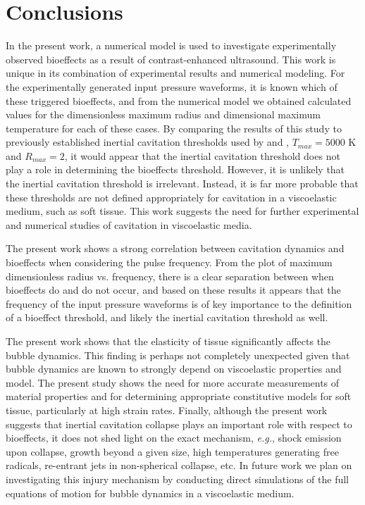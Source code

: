 \section{Conclusions}
\label{sec:conclusions}

In the present work, a numerical model is used
to investigate experimentally observed bioeffects as a result of
contrast-enhanced ultrasound. This work is unique in its 
combination of experimental results and numerical modeling.
For the experimentally generated input
pressure waveforms, it is known which of these triggered bioeffects,
and from the numerical model we obtained calculated values for
the dimensionless maximum radius and dimensional maximum temperature for each of these cases.  By comparing the
results of this study to previously established inertial cavitation
thresholds used by \cite{Apfel1991} and \cite{Yang2005},
$T_{max}=5000$ K and $R_{max}=2$, it would appear that the inertial
cavitation threshold does not play a role in determining the bioeffects
threshold.  However, it is unlikely that the inertial cavitation
threshold is irrelevant. Instead, it is far more probable that these
thresholds are not defined appropriately for cavitation in a
viscoelastic medium, such as soft tissue. This work suggests the need for
further experimental and numerical studies of cavitation in viscoelastic media.

The present work shows a strong correlation between cavitation dynamics and bioeffects
when considering the pulse frequency.
From the plot of maximum
dimensionless radius vs. frequency, there is a clear separation
between when bioeffects do and do not occur, and based on these
results it appears that the frequency of the input pressure waveforms
is of key importance to the definition of a bioeffect threshold, and
likely the inertial cavitation threshold as well. 

The present work shows that the elasticity of tissue significantly
affects the bubble dynamics. This finding is perhaps not completely
unexpected given that bubble dynamics are known to strongly depend
on viscoelastic properties and model. The present study shows the need
for more accurate measurements of material properties and for
determining appropriate constitutive models for soft tissue,
particularly at high strain rates. Finally, although the present work
suggests that inertial cavitation collapse plays an important role with respect
to bioeffects, it does not shed light on the exact mechanism,
\emph{e.g.}, shock emission upon collapse, growth beyond a given size,
high temperatures generating free radicals, re-entrant jets in
non-spherical collapse, etc.  In future work we plan on investigating 
this injury mechanism by conducting direct simulations of
the full equations of motion for bubble dynamics in a viscoelastic medium.


